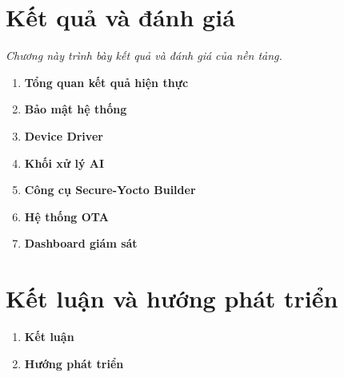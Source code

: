 \documentclass[a4paper,12pt]{report}
\begin{document}
\newpage


\chapter{Kết quả và đánh giá}
\textcolor{chaptercolor}{\textit{Chương này trình bày kết quả và đánh giá của nền tảng.}}

\begin{enumerate}[
    leftmargin=2.5em,
    labelsep=0.8em,
    itemsep=0.6em
]
  \renewcommand{\labelenumi}{\textcolor{chaptercolor}{\bfseries \thechapter.\arabic{enumi}}}
  \item \textbf{Tổng quan kết quả hiện thực}
  \item \textbf{Bảo mật hệ thống}
  \item \textbf{Device Driver}
  \item \textbf{Khối xử lý AI}
  \item \textbf{Công cụ Secure-Yocto Builder}
  \item \textbf{Hệ thống OTA}
  \item \textbf{Dashboard giám sát}
\end{enumerate}

\newpage



\chapter{Kết luận và hướng phát triển }


\begin{enumerate}[
    leftmargin=2.5em,
    labelsep=0.8em,
    itemsep=0.6em
]
  \renewcommand{\labelenumi}{\textcolor{chaptercolor}{\bfseries \thechapter.\arabic{enumi}}}
  \item \textbf{Kết luận}
  \item \textbf{Hướng phát triển}
\end{enumerate}

\newpage




\end{document}
